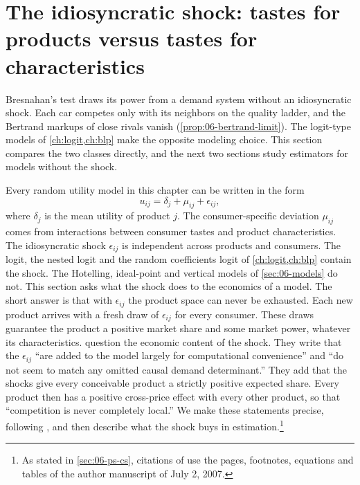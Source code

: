 \section{The idiosyncratic shock: tastes for products versus tastes for characteristics}\label{sec:06-epsilon}

Bresnahan's test draws its power from a demand system without an idiosyncratic shock. Each car competes only with
its neighbors on the quality ladder, and the Bertrand markups of close rivals vanish (\cref{prop:06-bertrand-limit}).
The logit-type models of \cref{ch:logit,ch:blp} make the opposite modeling choice. This section compares the two
classes directly, and the next two sections study estimators for models without the shock.

Every random utility model in this chapter can be written in the form
\begin{equation}\label{eq:06-u-general}
  u_{ij} = \delta_j + \mu_{ij} + \epsilon_{ij},
\end{equation}
where $\delta_j$ is the mean utility of product $j$. The consumer-specific deviation $\mu_{ij}$ comes from
interactions between consumer tastes and product characteristics. The idiosyncratic shock $\epsilon_{ij}$ is
independent across products and consumers. The logit, the nested logit and the random coefficients logit of
\cref{ch:logit,ch:blp} contain the shock. The Hotelling, ideal-point and vertical models of \cref{sec:06-models} do
not. This section asks what the shock does to the economics of a model. The short answer is that with
$\epsilon_{ij}$ the product space can never be exhausted. Each new product arrives with a fresh draw of $\epsilon_{ij}$
for every consumer. These draws guarantee the product a positive market share and some market power, whatever its
characteristics. \citet[p.~34]{AckerbergEtAl2007} question the economic content of the shock. They write that the
$\epsilon_{ij}$ ``are added to the model largely for computational convenience'' and ``do not seem to match any omitted
causal demand determinant.'' They add that the shocks give every conceivable product a strictly positive expected share.
Every product then has a positive cross-price effect with every other product, so that ``competition is never completely
local.'' We make these statements precise, following \citet{BerryPakes2007}, and then describe what the shock
buys in estimation.\footnote{As stated in \cref{sec:06-ps-cs}, citations of \citet{BerryPakes2007} use the
pages, footnotes, equations and tables of the author manuscript of July 2, 2007.}

